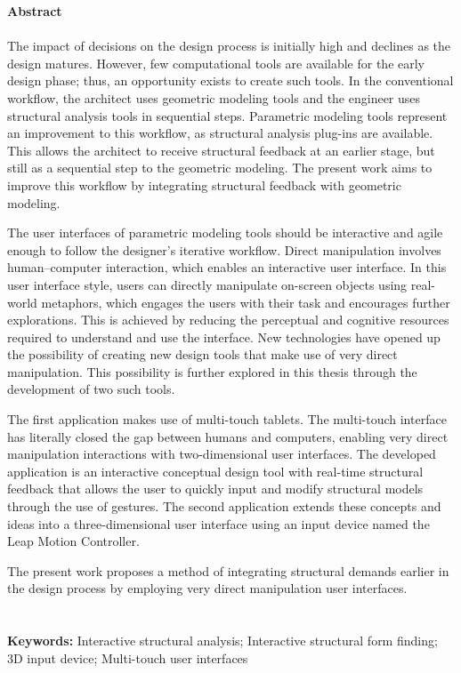 \null\vfill

{\Huge \textbf{Abstract}} \\ \\

The impact of decisions on the design process is initially high and declines as the design matures. However, few computational tools are available for the early design phase; thus, an opportunity exists to create such tools. In the conventional workflow, the architect uses geometric modeling tools and the engineer uses structural analysis tools in sequential steps. Parametric modeling tools represent an improvement to this workflow, as structural analysis plug-ins are available. This allows the architect to receive structural feedback at an earlier stage, but still as a sequential step to the geometric modeling. The present work aims to improve this workflow by integrating structural feedback with geometric modeling.
 
The user interfaces of parametric modeling tools should be interactive and agile enough to follow the designer’s iterative workflow. Direct manipulation involves human--computer interaction, which enables an interactive user interface. In this user interface style, users can directly manipulate on-screen objects using real-world metaphors, which engages the users with their task and encourages further explorations. This is achieved by reducing the perceptual and cognitive resources required to understand and use the interface. New technologies have opened up the possibility of creating new design tools that make use of very direct manipulation. This possibility is further explored in this thesis through the development of two such tools. 

The first application makes use of multi-touch tablets. The multi-touch interface has literally closed the gap between humans and computers, enabling very direct manipulation interactions with two-dimensional user interfaces. The developed application is an interactive conceptual design tool with real-time structural feedback that allows the user to quickly input and modify structural models through the use of gestures. The second application extends these concepts and ideas into a three-dimensional user interface using an input device named the Leap Motion Controller. 

The present work proposes a method of integrating structural demands earlier in the design process by employing very direct manipulation user interfaces.
\\
\\
\\
\textbf{Keywords:} Interactive structural analysis; Interactive structural form finding; 3D input device; Multi-touch user interfaces



\vfill\vfill\vfill\vfill\null
